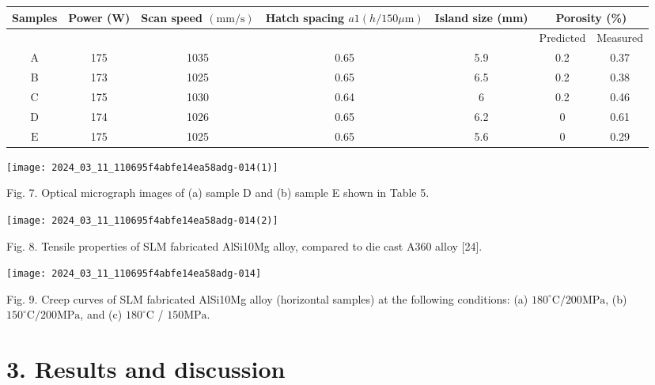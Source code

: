\documentclass[10pt]{article}
\begin{document}
\begin{center}
\begin{tabular}{|c|c|c|c|c|c|c|}
\hline
\multirow[t]{2}{*}{Samples} & \multirow[t]{2}{*}{Power (W)} & \multirow[t]{2}{*}{Scan speed $(\mathrm{mm} / \mathrm{s})$} & \multirow[t]{2}{*}{Hatch spacing $a 1(h / 150 \mu \mathrm{m})$} & \multirow[t]{2}{*}{Island size (mm)} & \multicolumn{2}{|c|}{Porosity (\%)} \\
\hline
 &  &  &  &  & Predicted & Measured \\
\hline
A & 175 & 1035 & 0.65 & 5.9 & 0.2 & 0.37 \\
\hline
B & 173 & 1025 & 0.65 & 6.5 & 0.2 & 0.38 \\
\hline
C & 175 & 1030 & 0.64 & 6 & 0.2 & 0.46 \\
\hline
$\mathrm{D}$ & 174 & 1026 & 0.65 & 6.2 & 0 & 0.61 \\
\hline
$\mathrm{E}$ & 175 & 1025 & 0.65 & 5.6 & 0 & 0.29 \\
\hline
\end{tabular}
\end{center}

\begin{center}
\texttt{[image: 2024\_03\_11\_110695f4abfe14ea58adg-014(1)]}
\end{center}

Fig. 7. Optical micrograph images of (a) sample D and (b) sample E shown in Table 5.

\begin{center}
\texttt{[image: 2024\_03\_11\_110695f4abfe14ea58adg-014(2)]}
\end{center}

Fig. 8. Tensile properties of SLM fabricated AlSi10Mg alloy, compared to die cast A360 alloy [24].

\begin{center}
\texttt{[image: 2024\_03\_11\_110695f4abfe14ea58adg-014]}
\end{center}

Fig. 9. Creep curves of SLM fabricated AlSi10Mg alloy (horizontal samples) at the following conditions: (a) $180^{\circ} \mathrm{C} / 200 \mathrm{MPa}$, (b) $150^{\circ} \mathrm{C} / 200 \mathrm{MPa}$, and (c) $180^{\circ} \mathrm{C}$ / $150 \mathrm{MPa}$.

\section*{3. Results and discussion}
\end{document}
